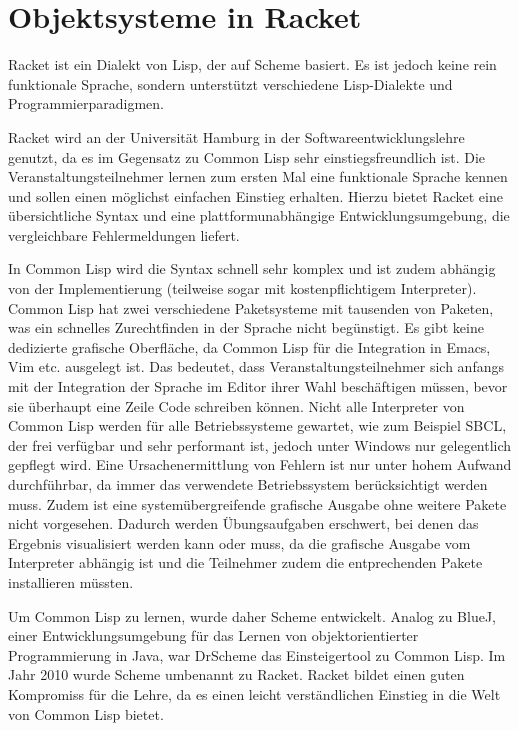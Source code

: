 \chapter{Objektsysteme in Racket}
Racket ist ein Dialekt von Lisp, der auf Scheme basiert. Es ist jedoch keine rein funktionale Sprache, sondern unterstützt verschiedene Lisp-Dialekte und  Programmierparadigmen. 

Racket wird an der Universität Hamburg in der Softwareentwicklungslehre genutzt, da es im Gegensatz zu Common Lisp sehr einstiegsfreundlich ist. Die Veranstaltungsteilnehmer lernen zum ersten Mal eine funktionale Sprache kennen und sollen einen möglichst einfachen Einstieg erhalten. Hierzu bietet Racket eine übersichtliche Syntax und eine plattformunabhängige Entwicklungsumgebung, die vergleichbare Fehlermeldungen liefert.

In Common Lisp wird die Syntax schnell sehr komplex und ist zudem abhängig von der Implementierung (teilweise sogar mit kostenpflichtigem Interpreter). Common Lisp hat zwei verschiedene Paketsysteme mit tausenden von Paketen, was ein schnelles Zurechtfinden in der Sprache nicht begünstigt. Es gibt keine dedizierte grafische Oberfläche, da Common Lisp für die Integration in Emacs, Vim etc. ausgelegt ist. Das bedeutet, dass Veranstaltungsteilnehmer sich anfangs mit der Integration der Sprache im Editor ihrer Wahl beschäftigen müssen, bevor sie überhaupt eine Zeile Code schreiben können. Nicht alle Interpreter von Common Lisp werden  für alle Betriebssysteme gewartet, wie zum Beispiel SBCL, der frei verfügbar und sehr performant ist, jedoch unter Windows nur gelegentlich gepflegt wird. Eine Ursachenermittlung von Fehlern ist nur unter hohem Aufwand durchführbar, da immer das verwendete Betriebssystem berücksichtigt werden muss. Zudem ist eine systemübergreifende grafische Ausgabe ohne weitere Pakete nicht vorgesehen. Dadurch werden Übungsaufgaben erschwert, bei denen das Ergebnis visualisiert werden kann oder muss, da die grafische Ausgabe vom Interpreter abhängig ist und die Teilnehmer zudem die entprechenden Pakete installieren müssten. 

Um Common Lisp zu lernen, wurde daher Scheme entwickelt. Analog zu BlueJ, einer Entwicklungsumgebung für das Lernen von objektorientierter Programmierung in Java, war DrScheme das Einsteigertool zu Common Lisp. Im Jahr 2010 wurde Scheme umbenannt zu Racket. Racket bildet einen guten Kompromiss für die Lehre, da es einen leicht verständlichen Einstieg in die Welt von Common Lisp bietet.

